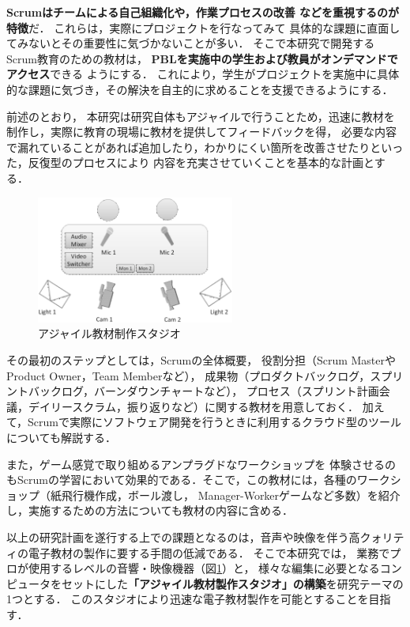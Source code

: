 \documentclass[11pt,a4paper,twoside]{jarticle}
\newcommand{\研究種別}{B}	%
\newcommand{\研究課題名}{コ・クリエイティブなソフトウェア開発者を育成するPBL型教育}
\newcommand{\研究機関名}{産業技術大学院大学}
\newcommand{\研究代表者氏名}{中鉢　欣秀}
\newcommand{\研究代表者氏名ふりがな}{ちゅうばち　よしひで}
\newcommand{\本応募effort}{\KLEffort{18}}	%
\newcommand{\研究期間の最終元号年度}{27}	%
\begin{document}
{	{\bf Scrumはチームによる自己組織化や，作業プロセスの改善
	などを重視するのが特徴}だ．
	これらは，実際にプロジェクトを行なってみて
	具体的な課題に直面してみないとその重要性に気づかないことが多い．
	そこで本研究で開発するScrum教育のための教材は，
	{\bf PBLを実施中の学生および教員がオンデマンドでアクセス}できる
	ようにする．
	これにより，学生がプロジェクトを実施中に具体的な課題に気づき，その解決を自主的に求めることを支援できるようにする．
	
	前述のとおり，
	本研究は研究自体もアジャイルで行うことため，迅速に教材を制作し，実際に教育の現場に教材を提供してフィードバックを得，
	必要な内容で漏れていることがあれば追加したり，わかりにくい箇所を改善させたりといった，反復型のプロセスにより
	内容を充実させていくことを基本的な計画とする．

         \begin{figure}
         	\begin{center}
		         \includegraphics[width=6.5cm]{figs/studio.eps}
		         \caption{アジャイル教材制作スタジオ}
		         \label{fig:studio}
	         \end{center}
         \end{figure}
	
	その最初のステップとしては，Scrumの全体概要，
	役割分担（Scrum MasterやProduct Owner，Team Memberなど），
	成果物（プロダクトバックログ，スプリントバックログ，バーンダウンチャートなど），
	プロセス（スプリント計画会議，デイリースクラム，振り返りなど）に関する教材を用意しておく．
	加えて，Scrumで実際にソフトウェア開発を行うときに利用するクラウド型のツールについても解説する．

	また，ゲーム感覚で取り組めるアンプラグドなワークショップを
	体験させるのもScrumの学習において効果的である．そこで，この教材には，各種のワークショップ（紙飛行機作成，ボール渡し，
	Manager-Workerゲームなど多数）を紹介し，実施するための方法についても教材の内容に含める．

	以上の研究計画を遂行する上での課題となるのは，音声や映像を伴う高クォリティの電子教材の製作に要する手間の低減である．
	そこで本研究では，
	業務でプロが使用するレベルの音響・映像機器（図\ref{fig:studio}）と，
	様々な編集に必要となるコンピュータをセットにした{\bf 「アジャイル教材製作スタジオ」の構築}を研究テーマの1つとする．
	このスタジオにより迅速な電子教材製作を可能とすることを目指す．

}
\end{document}
